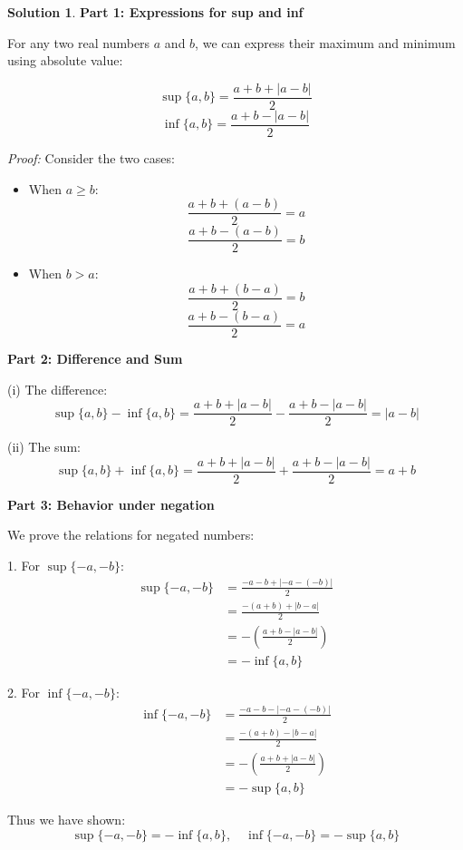 \documentclass{article}
\theoremstyle{definition}
\newtheorem*{solution}{Solution}
\begin{document}
\begin{solution}

\textbf{Part 1: Expressions for sup and inf}

For any two real numbers \( a \) and \( b \), we can express their maximum and minimum using absolute value:

\[
\sup\{a, b\} = \frac{a + b + |a - b|}{2}
\]
\[
\inf\{a, b\} = \frac{a + b - |a - b|}{2}
\]

\textit{Proof:} Consider the two cases:
\begin{itemize}
\item When \( a \geq b \):
  \[ \frac{a + b + (a - b)}{2} = a \]
  \[ \frac{a + b - (a - b)}{2} = b \]
  
\item When \( b > a \):
  \[ \frac{a + b + (b - a)}{2} = b \]
  \[ \frac{a + b - (b - a)}{2} = a \]
\end{itemize}

\textbf{Part 2: Difference and Sum}

(i) The difference:
\[
\sup\{a, b\} - \inf\{a, b\} = \frac{a + b + |a - b|}{2} - \frac{a + b - |a - b|}{2} = |a - b|
\]

(ii) The sum:
\[
\sup\{a, b\} + \inf\{a, b\} = \frac{a + b + |a - b|}{2} + \frac{a + b - |a - b|}{2} = a + b
\]

\textbf{Part 3: Behavior under negation}

We prove the relations for negated numbers:

1. For \( \sup\{-a, -b\} \):
\begin{align*}
\sup\{-a, -b\} &= \frac{-a - b + |-a - (-b)|}{2} \\
&= \frac{-(a + b) + |b - a|}{2} \\
&= -\left( \frac{a + b - |a - b|}{2} \right) \\
&= -\inf\{a, b\}
\end{align*}

2. For \( \inf\{-a, -b\} \):
\begin{align*}
\inf\{-a, -b\} &= \frac{-a - b - |-a - (-b)|}{2} \\
&= \frac{-(a + b) - |b - a|}{2} \\
&= -\left( \frac{a + b + |a - b|}{2} \right) \\
&= -\sup\{a, b\}
\end{align*}

Thus we have shown:
\[
\sup\{-a, -b\} = -\inf\{a, b\}, \quad \inf\{-a, -b\} = -\sup\{a, b\}
\]
\end{solution}
\end{document}
